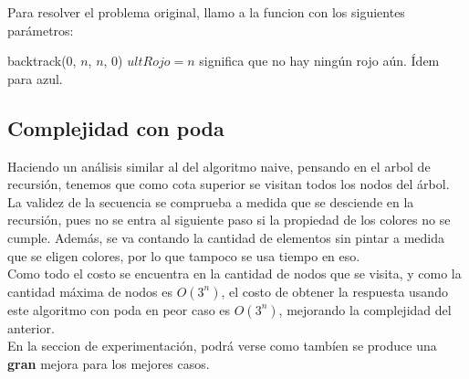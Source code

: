 Para resolver el problema original, llamo a la funcion con los siguientes parámetros:

\begin{algorithm}[H]
\begin{algorithmic}
  \State backtrack($0$, $n$, $n$, $0$) \Comment $ultRojo = n$ significa que no hay ningún rojo aún. Ídem para azul.
\EndProcedure
\end{algorithmic}
\end{algorithm}


\subsection{Complejidad con poda}

Haciendo un análisis similar al del algoritmo naive, pensando en el arbol de recursión, tenemos que como cota superior se visitan todos los nodos del árbol. La validez de la secuencia se comprueba a medida que se desciende en la recursión, pues no se entra al siguiente paso si la propiedad de los colores no se cumple. Además, se va contando la cantidad de elementos sin pintar a medida que se eligen colores, por lo que tampoco se usa tiempo en eso. \\

Como todo el costo se encuentra en la cantidad de nodos que se visita, y como la cantidad máxima de nodos es $O(3^{n})$, el costo de obtener la respuesta usando este algoritmo con poda en peor caso es $O(3^n)$, mejorando la complejidad del anterior. \\ 

En la seccion de experimentación, podrá verse como tambíen se produce una \textbf{gran} mejora para los mejores casos. \\ 

